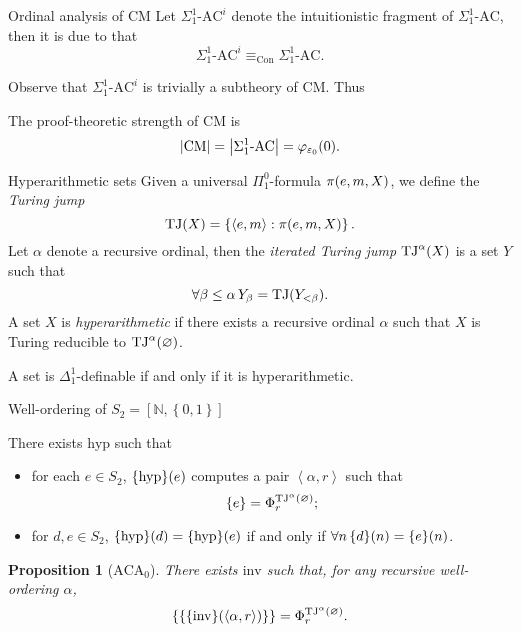 \documentclass{beamer}
\newtheorem{proposition}{Proposition}
\theoremstyle{definition}
\newcommand{\tuple}[1]{\left\langle #1 \right\rangle}
\newcommand{\CM}{\mathrm{CM}}
\newcommand{\SigAC}{\Sigma^1_1\text{-}\mathrm{AC}}
\DeclareMathOperator{\TJ}{TJ}
\begin{document}
\begin{frame}{Ordinal analysis of $\CM$}
  Let $\SigAC^i$ denote the intuitionistic fragment of $\SigAC$, then it is due to \cite{aczel77-martin-lof} that
  \[\SigAC^i \equiv_\text{Con} \SigAC.\]

  Observe that $\SigAC^i$ is trivially a subtheory of $\CM$. Thus
  \begin{corollary}
    The proof-theoretic strength of $\CM$ is
    \[\left|\CM\right| = \left|\SigAC\right| = \varphi_{\varepsilon_0}\mleft(0\mright).\]
  \end{corollary}
\end{frame}

\begin{frame}{Hyperarithmetic sets}
  Given a universal $\Pi^0_1$-formula $\pi\mleft(e, m, X\mright)$, we define the \emph{Turing jump}
  \[\TJ\mleft(X\mright) = \left\{\tuple{e, m} : \pi\mleft(e, m, X\mright)\right\}.\]
  Let $\alpha$ denote a recursive ordinal, then the \emph{iterated Turing jump} $\TJ^{\alpha}\mleft(X\mright)$ is a set $Y$ such that
  \[\forall \beta \leq \alpha \, Y_\beta = \TJ\mleft(Y_{<\beta}\mright).\]
  A set $X$ is \emph{hyperarithmetic} if there exists a recursive ordinal $\alpha$ such that $X$ is Turing reducible to $\TJ^{\alpha}\mleft(\varnothing\mright)$.

  \begin{theorem}
    A set is $\Delta^1_1$-definable if and only if it is hyperarithmetic.
  \end{theorem}
\end{frame}

\begin{frame}{Well-ordering of $S_2 = \left[\mathbb{N}, \left\{0, 1\right\}\right]$}
  \begin{theorem}
    There exists $\mathrm{hyp}$ such that
    \begin{itemize}
      \item for each $e \in S_2$, $\mleft\{\mathrm{hyp}\mright\}\mleft(e\mright)$ computes a pair $\tuple{\alpha, r}$ such that
            \[\left\{e\right\} = \Phi^{\TJ^\alpha\mleft(\varnothing\mright)}_r;\]
      \item for $d, e \in S_2$, $\mleft\{\mathrm{hyp}\mright\}\mleft(d\mright) = \mleft\{\mathrm{hyp}\mright\}\mleft(e\mright)$ if and only if $\forall n \, \mleft\{d\mright\}\mleft(n\mright) = \mleft\{e\mright\}\mleft(n\mright)$.
    \end{itemize}
  \end{theorem}

  \begin{proposition}[$\mathrm{ACA}_0$]
    There exists $\mathrm{inv}$ such that, for any recursive well-ordering $\alpha$,
    \[\left\{\mleft\{\mleft\{\mathrm{inv}\mright\}\mleft(\tuple{\alpha, r}\mright)\mright\}\right\} = \Phi^{\TJ^\alpha\mleft(\varnothing\mright)}_r.\]
  \end{proposition}
\end{frame}
\end{document}
